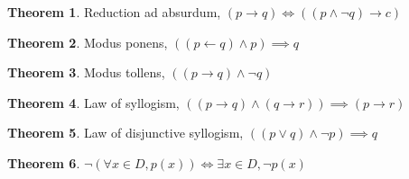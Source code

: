 \documentclass[11pt]{article}
\theoremstyle{definition}
\newtheorem{theorem}{Theorem}[section]
\begin{document}
\begin{theorem} Reduction ad absurdum,
    $(p \rightarrow q) \iff ((p \land \lnot q) \rightarrow c)$
\end{theorem}
\begin{theorem} Modus ponens,
    $((p \leftarrow q) \land p) \implies q$
\end{theorem}
\begin{theorem} Modus tollens,
    $((p \rightarrow q) \land \lnot q) $
\end{theorem}
\begin{theorem} Law of syllogism,
    $((p \rightarrow q)\land(q \rightarrow r)) \implies (p \rightarrow r)$
\end{theorem}
\begin{theorem} Law of disjunctive syllogism,
    $((p \lor q) \land \lnot p) \implies q$
\end{theorem}
\begin{theorem}
    $\lnot(\forall x \in D, p(x)) \iff \exists x \in D, \lnot p(x)$
\end{theorem}
\end{document}
